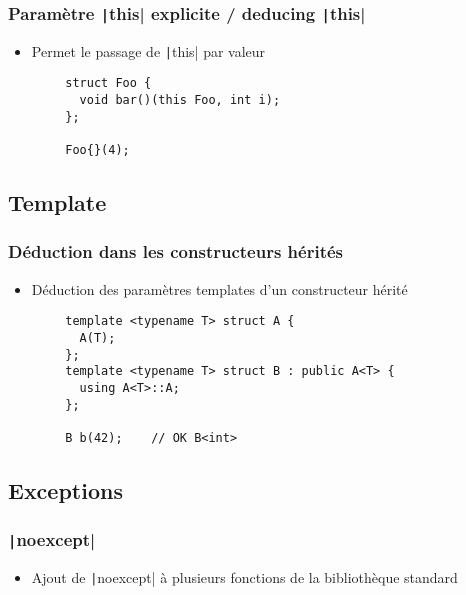 \documentclass[C++.tex]{subfiles}
\begin{document}
\begin{frame}[fragile]
	\frametitle{Paramètre \texttt|this| explicite / deducing \texttt|this|}
	\begin{itemize}
		\item Permet le passage de \texttt|this| par valeur
	\end{itemize}

	\begin{verbatim}
		struct Foo {
		  void bar()(this Foo, int i);
		};

		Foo{}(4);
	\end{verbatim}
\end{frame}

\subsection*{Template}
\begin{frame}[fragile]
	\frametitle{Déduction dans les constructeurs hérités}
	\begin{itemize}
		\item Déduction des paramètres templates d'un constructeur hérité
	\end{itemize}

	\begin{verbatim}
		template <typename T> struct A {
		  A(T);
		};
		template <typename T> struct B : public A<T> {
		  using A<T>::A;
		};

		B b(42);	// OK B<int>
	\end{verbatim}

\end{frame}

\subsection*{Exceptions}
\begin{frame}[fragile]
	\frametitle{\texttt|noexcept|}
	\begin{itemize}
		\item Ajout de \texttt|noexcept| à plusieurs fonctions de la bibliothèque standard
	\end{itemize}
\end{frame}
\end{document}
